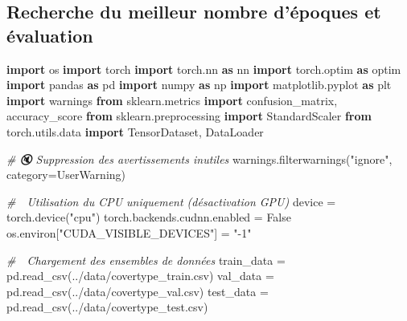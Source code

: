 \documentclass[
]{article}
\newenvironment{Shaded}{}{}
\newcommand{\CommentTok}[1]{\textcolor[rgb]{0.38,0.63,0.69}{\textit{#1}}}
\newcommand{\ImportTok}[1]{\textcolor[rgb]{0.00,0.50,0.00}{\textbf{#1}}}
\newcommand{\NormalTok}[1]{#1}
\newcommand{\OperatorTok}[1]{\textcolor[rgb]{0.40,0.40,0.40}{#1}}
\newcommand{\PreprocessorTok}[1]{\textcolor[rgb]{0.74,0.48,0.00}{#1}}
\newcommand{\StringTok}[1]{\textcolor[rgb]{0.25,0.44,0.63}{#1}}
\newcommand{\VariableTok}[1]{\textcolor[rgb]{0.10,0.09,0.49}{#1}}
\begin{document}
\subsection{Recherche du meilleur nombre d'époques et
évaluation}\label{recherche-du-meilleur-nombre-duxe9poques-et-uxe9valuation}

\begin{Shaded}
\begin{Highlighting}[]
\ImportTok{import}\NormalTok{ os}
\ImportTok{import}\NormalTok{ torch}
\ImportTok{import}\NormalTok{ torch.nn }\ImportTok{as}\NormalTok{ nn}
\ImportTok{import}\NormalTok{ torch.optim }\ImportTok{as}\NormalTok{ optim}
\ImportTok{import}\NormalTok{ pandas }\ImportTok{as}\NormalTok{ pd}
\ImportTok{import}\NormalTok{ numpy }\ImportTok{as}\NormalTok{ np}
\ImportTok{import}\NormalTok{ matplotlib.pyplot }\ImportTok{as}\NormalTok{ plt}
\ImportTok{import}\NormalTok{ warnings}
\ImportTok{from}\NormalTok{ sklearn.metrics }\ImportTok{import}\NormalTok{ confusion\_matrix, accuracy\_score}
\ImportTok{from}\NormalTok{ sklearn.preprocessing }\ImportTok{import}\NormalTok{ StandardScaler}
\ImportTok{from}\NormalTok{ torch.utils.data }\ImportTok{import}\NormalTok{ TensorDataset, DataLoader}

\CommentTok{\# 🔇 Suppression des avertissements inutiles}
\NormalTok{warnings.filterwarnings(}\StringTok{"ignore"}\NormalTok{, category}\OperatorTok{=}\PreprocessorTok{UserWarning}\NormalTok{)}

\CommentTok{\# 🔌 Utilisation du CPU uniquement (désactivation GPU)}
\NormalTok{device }\OperatorTok{=}\NormalTok{ torch.device(}\StringTok{"cpu"}\NormalTok{)}
\NormalTok{torch.backends.cudnn.enabled }\OperatorTok{=} \VariableTok{False}
\NormalTok{os.environ[}\StringTok{"CUDA\_VISIBLE\_DEVICES"}\NormalTok{] }\OperatorTok{=} \StringTok{"{-}1"}

\CommentTok{\# 🔄 Chargement des ensembles de données}
\NormalTok{train\_data }\OperatorTok{=}\NormalTok{ pd.read\_csv(}\StringTok{\textquotesingle{}../data/covertype\_train.csv\textquotesingle{}}\NormalTok{)}
\NormalTok{val\_data }\OperatorTok{=}\NormalTok{ pd.read\_csv(}\StringTok{\textquotesingle{}../data/covertype\_val.csv\textquotesingle{}}\NormalTok{)}
\NormalTok{test\_data }\OperatorTok{=}\NormalTok{ pd.read\_csv(}\StringTok{\textquotesingle{}../data/covertype\_test.csv\textquotesingle{}}\NormalTok{)}


\end{Highlighting}
\end{Shaded}
\end{document}
